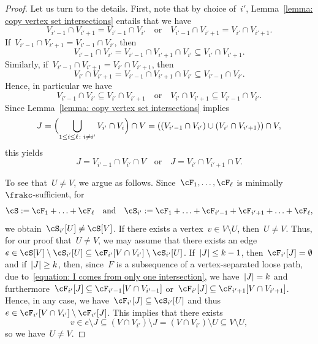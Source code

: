 \documentclass[11pt]{amsart}
\DeclarePairedDelimiter{\paren}{\lparen}{\rparen}
\DeclarePairedDelimiter{\abs}{\lvert}{\rvert}
\newcommand{\qtand}{\quad\text{and}\quad}
\newcommand{\qtor}{\quad\text{or}\quad}
\theoremstyle{definition}
\numberwithin{equation}{section}
\begin{document}
\begin{proof}
		Let us turn to the details.
		First, note that by choice of~$i'$, Lemma~\ref{lemma: copy vertex set intersections} entails that we have
		\begin{equation*}
			V_{i'-1}\cap V_{i'+1}=V_{i'-1}\cap V_{i'}
			\qtor
			V_{i'-1}\cap V_{i'+1}=V_{i'}\cap V_{i'+1}.
		\end{equation*}
		If~$V_{i'-1}\cap V_{i'+1}=V_{i'-1}\cap V_{i'}$, then
		\begin{equation*}
			V_{i'-1}\cap V_{i'}
			=V_{i'-1}\cap V_{i'+1}\cap V_{i'}
			\subseteq V_{i'}\cap V_{i'+1}.
		\end{equation*}
		Similarly, if~$V_{i'-1}\cap V_{i'+1}=V_{i'}\cap V_{i'+1}$, then
		\begin{equation*}
			V_{i'}\cap V_{i'+1}
			=V_{i'-1}\cap V_{i'+1}\cap V_{i'}
			\subseteq V_{i'-1}\cap V_{i'}.
		\end{equation*}
		Hence, in particular we have
		\begin{equation*}
			V_{i'-1}\cap V_{i'}\subseteq V_{i'}\cap V_{i'+1}
			\qtor
			V_{i'}\cap V_{i'+1}\subseteq V_{i'-1}\cap V_{i'}.
		\end{equation*}
		Since Lemma~\ref{lemma: copy vertex set intersections} implies
		\begin{equation*}
			J
			=\paren[\Big]{ \bigcup_{1\leq i\leq\ell\colon i\neq i'} V_{i'}\cap V_{i} }\cap V
			=((V_{i'-1}\cap V_{i'})\cup (V_{i'}\cap V_{i'+1}))\cap V,
		\end{equation*}
		this yields
		\begin{equation}\label{equation: I comes from only one intersection}
			J=V_{i'-1}\cap V_{i'}\cap V
			\qtor
			J=V_{i'}\cap V_{i'+1}\cap V.
		\end{equation}
		
		To see that~$U\neq V$, we argue as follows.
		Since~$\cF_1,\ldots,\cF_\ell$ is minimally~$\frakc$-sufficient, for
		\begin{equation*}
			\cS:=\cF_1+\ldots+\cF_{\ell}
			\qtand
			\cS_{i'}:=\cF_1+\ldots+\cF_{i'-1}+\cF_{i'+1}+\ldots+\cF_\ell,
		\end{equation*}
		we obtain~$\cS_{i'}[U]\neq\cS[V]$.
		If there exists a vertex~$v\in V\setminus U$, then~$U\neq V$.
		Thus, for our proof that~$U\neq V$, we may assume that there exists an edge~$e\in \cS[V]\setminus \cS_{i'}[U]\subseteq \cF_{i'}[V\cap V_{i'}]\setminus \cS_{i'}[U]$.
		If~$\abs{J}\leq k-1$, then~$\cF_{i'}[J]=\emptyset$ and if~$\abs{J}\geq k$, then, since~$F$ is a subsequence of a vertex-separated loose path, due to~\eqref{equation: I comes from only one intersection}, we have~$\abs{J}=k$ and furthermore~$\cF_{i'}[J]\subseteq \cF_{i'-1}[V\cap V_{i'-1}]$ or~$\cF_{i'}[J]\subseteq \cF_{i'+1}[V\cap V_{i'+1}]$.
		Hence, in any case, we have~$\cF_{i'}[J]\subseteq \cS_{i'}[U]$ and thus~$e\in \cF_{i'}[V\cap V_{i'}]\setminus \cF_{i'}[J]$.
		This implies that there exists
		\begin{equation*}
			v
			\in e\setminus J
			\subseteq (V\cap V_{i'})\setminus J
			=(V\cap V_{i'})\setminus U
			\subseteq V\setminus U,
		\end{equation*}
		so we have~$U\neq V$.
		

\end{proof}
\end{document}
